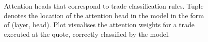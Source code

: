 \begin{figure}[!ht]
    \caption[Rule-Like Roles of All Attention Heads]{Attention heads that correspond to trade classification rules. Tuple denotes the location of the attention head in the model in the form of (layer, head). Plot visualises the attention weights for a trade executed at the quote, correctly classified by the model.}
    \label{fig:attention-heads-ise-all-transformer}
\end{figure}